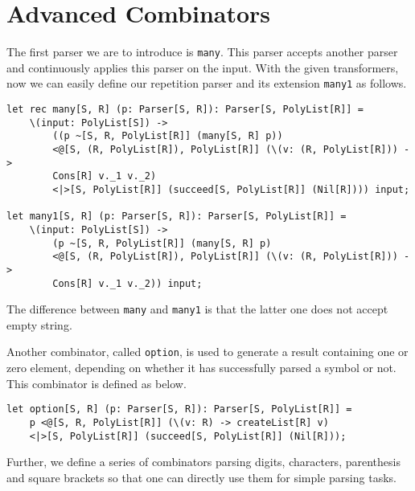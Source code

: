 \section{Advanced Combinators}
The first parser we are to introduce is \texttt{many}. This parser accepts another parser and continuously applies this parser on the input. With the given transformers, now we can easily define our repetition parser and its extension \texttt{many1} as follows.
\begin{lstlisting}
let rec many[S, R] (p: Parser[S, R]): Parser[S, PolyList[R]] =
    \(input: PolyList[S]) ->
        ((p ~[S, R, PolyList[R]] (many[S, R] p))
        <@[S, (R, PolyList[R]), PolyList[R]] (\(v: (R, PolyList[R])) ->
        Cons[R] v._1 v._2)
        <|>[S, PolyList[R]] (succeed[S, PolyList[R]] (Nil[R]))) input;

let many1[S, R] (p: Parser[S, R]): Parser[S, PolyList[R]] =
    \(input: PolyList[S]) ->
        (p ~[S, R, PolyList[R]] (many[S, R] p)
        <@[S, (R, PolyList[R]), PolyList[R]] (\(v: (R, PolyList[R])) ->
        Cons[R] v._1 v._2)) input;
\end{lstlisting}
The difference between \texttt{many} and \texttt{many1} is that the latter one does not accept empty string.

Another combinator, called \texttt{option}, is used to generate a result containing one or zero element, depending on whether it has successfully parsed a symbol or not. This combinator is defined as below.
\begin{lstlisting}
let option[S, R] (p: Parser[S, R]): Parser[S, PolyList[R]] =
    p <@[S, R, PolyList[R]] (\(v: R) -> createList[R] v)
    <|>[S, PolyList[R]] (succeed[S, PolyList[R]] (Nil[R]));
\end{lstlisting}
Further, we define a series of combinators parsing digits, characters, parenthesis and square brackets so that one can directly use them for simple parsing tasks.

